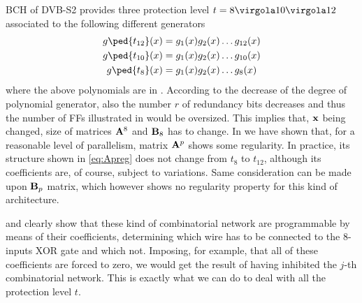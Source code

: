 BCH of DVB-S2 provides three protection level \(t = 8\virgola 10 \virgola 12\) associated to the following different generators
\begin{align}
g\ped{t_{12}}(x) & = g_1(x)g_2(x)\ldots g_{12}(x) \label{eq:BCHt12}\\
g\ped{t_{10}}(x) & = g_1(x)g_2(x)\ldots g_{10}(x) \label{eq:BCHt10}\\
g\ped{t_8}(x) & = g_1(x)g_2(x)\ldots g_{8}(x) \label{eq:BCHt8}
\end{align}
where the above polynomials are in .
According to the decrease of the degree of polynomial generator, also the number \(r\) of redundancy bits decreases and thus the number of FFs illustrated in  would be oversized. This implies that, \(\mathbf{x}\) being changed, size of matrices \(\mathbf{A}^8\) and \(\mathbf{B}_8\) has to change. In  we have shown that, for a reasonable level of parallelism, matrix \(\mathbf{A}^p\) shows some regularity. In practice, its structure shown in \eqref{eq:Apreg} does not change from \(t_8\) to \(t_{12}\), although its coefficients are, of course, subject to variations. Same consideration can be made upon \(\mathbf{B}_p\) matrix, which however shows no regularity property for this kind of architecture.

 and  clearly show that these kind of combinatorial network are programmable by means of their coefficients, determining which wire has to be connected to the 8-inputs XOR gate and which not. Imposing, for example, that all of these coefficients are forced to zero, we would get the result of having inhibited the \(j\)-th combinatorial network. This is exactly what we can do to deal with all the protection level \(t\).

